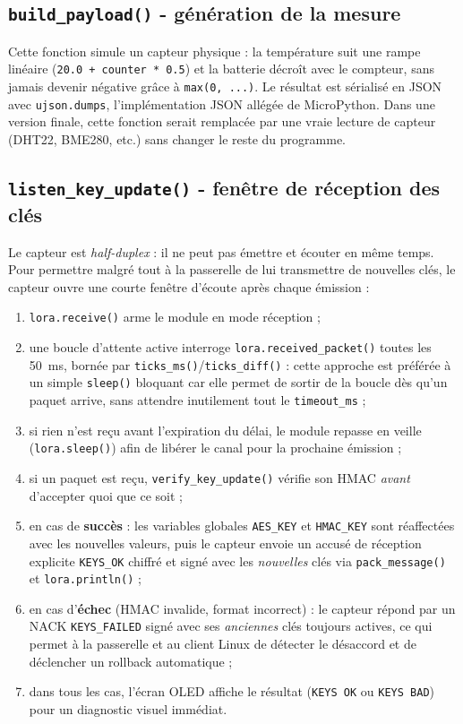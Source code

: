 \documentclass[a4paper,11pt]{report}
\begin{document}
\subsection{\texttt{build\_payload()} - génération de la mesure}
Cette fonction simule un capteur physique : la température suit une rampe linéaire
(\texttt{20.0 + counter * 0.5}) et la batterie décroît avec le compteur, sans jamais devenir négative
grâce à \texttt{max(0, ...)}. Le résultat est sérialisé en JSON avec \texttt{ujson.dumps}, l'implémentation
JSON allégée de MicroPython. Dans une version finale, cette fonction serait remplacée par une vraie
lecture de capteur (DHT22, BME280, etc.) sans changer le reste du programme.

\subsection{\texttt{listen\_key\_update()} - fenêtre de réception des clés}
Le capteur est \emph{half-duplex} : il ne peut pas émettre et écouter en même temps. Pour permettre
malgré tout à la passerelle de lui transmettre de nouvelles clés, le capteur ouvre une courte fenêtre
d'écoute après chaque émission :
\begin{enumerate}
    \item \texttt{lora.receive()} arme le module en mode réception ;
    \item une boucle d'attente active interroge \texttt{lora.received\_packet()} toutes les
    \SI{50}{\milli\second}, bornée par \texttt{ticks\_ms()}/\texttt{ticks\_diff()} : cette approche est
    préférée à un simple \texttt{sleep()} bloquant car elle permet de sortir de la boucle dès qu'un paquet
    arrive, sans attendre inutilement tout le \texttt{timeout\_ms} ;
    \item si rien n'est reçu avant l'expiration du délai, le module repasse en veille
    (\texttt{lora.sleep()}) afin de libérer le canal pour la prochaine émission ;
    \item si un paquet est reçu, \texttt{verify\_key\_update()} vérifie son HMAC \emph{avant} d'accepter
    quoi que ce soit ;
    \item en cas de \textbf{succès} : les variables globales \texttt{AES\_KEY} et \texttt{HMAC\_KEY} sont
    réaffectées avec les nouvelles valeurs, puis le capteur envoie un accusé de réception explicite
    \texttt{KEYS\_OK} chiffré et signé avec les \emph{nouvelles} clés via \texttt{pack\_message()} et
    \texttt{lora.println()} ;
    \item en cas d'\textbf{échec} (HMAC invalide, format incorrect) : le capteur répond par un NACK
    \texttt{KEYS\_FAILED} signé avec ses \emph{anciennes} clés toujours actives, ce qui permet à la
    passerelle et au client Linux de détecter le désaccord et de déclencher un rollback automatique ;
    \item dans tous les cas, l'écran OLED affiche le résultat (\texttt{KEYS OK} ou \texttt{KEYS BAD})
    pour un diagnostic visuel immédiat.
\end{enumerate}
\end{document}
